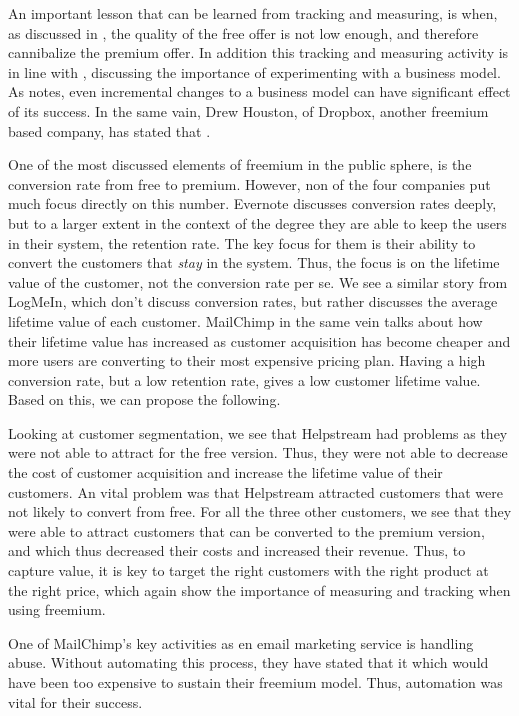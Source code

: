An important lesson that can be learned from tracking and measuring, is when, as discussed in , the quality of the free offer is not low enough, and therefore cannibalize the premium offer. In addition this tracking and measuring activity is in line with , discussing the importance of experimenting with a business model. As \citet{sosna2010} notes, even incremental changes to a business model can have significant effect of its success. In the same vain, Drew Houston,  of Dropbox, another freemium based company, has stated that  \citep{gannes2010}.

One of the most discussed elements of freemium in the public sphere, is the conversion rate from free to premium. However, non of the four companies put much focus directly on this number. Evernote discusses conversion rates deeply, but to a larger extent in the context of the degree they are able to keep the users in their system, \ie the retention rate. The key focus for them is their ability to convert the customers that \emph{stay} in the system. Thus, the focus is on the lifetime value of the customer, not the conversion rate per se. We see a similar story from LogMeIn, which don't discuss conversion rates, but rather discusses the average lifetime value of each customer. MailChimp in the same vein talks about how their lifetime value has increased as customer acquisition has become cheaper and more users are converting to their most expensive pricing plan. Having a high conversion rate, but a low retention rate, gives a low customer lifetime value. Based on this, we can propose the following. 


Looking at customer segmentation, we see that Helpstream had problems as they were not able to attract  for the free version. Thus, they were not able to decrease the cost of customer acquisition and increase the lifetime value of their customers. An vital problem was that Helpstream attracted customers that were not likely to convert from free. For all the three other customers, we see that they were able to attract customers that can be converted to the premium version, and which thus decreased their costs and increased their revenue. Thus, to capture value, it is key to target the right customers with the right product at the right price, which again show the importance of measuring and tracking when using freemium.

One of MailChimp's key activities as en email marketing service is handling abuse. Without automating this process, they have stated that it  which would have been too expensive to sustain their freemium model. Thus, automation was vital for their success.

